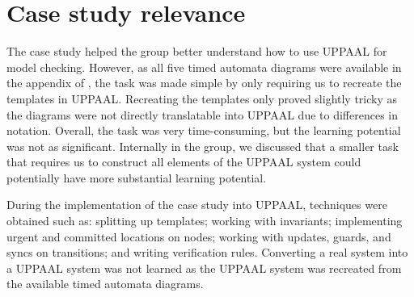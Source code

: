 \section{Case study relevance}

The case study helped the group better understand how to use UPPAAL for model checking. However, as all five timed automata diagrams were available in the appendix of \cite{gearcontrol}, the task was made simple by only requiring us to recreate the templates in UPPAAL. Recreating the templates only proved slightly tricky as the diagrams were not directly translatable into UPPAAL due to differences in notation. 
Overall, the task was very time-consuming, but the learning potential was not as significant. Internally in the group, we discussed that a smaller task that requires us to construct all elements of the UPPAAL system could potentially have more substantial learning potential.

During the implementation of the case study into UPPAAL, techniques were obtained such as: splitting up templates; working with invariants; implementing urgent and committed locations on nodes; working with updates, guards, and syncs on transitions; and writing verification rules. Converting a real system into a UPPAAL system was not learned as the UPPAAL system was recreated from the available timed automata diagrams.